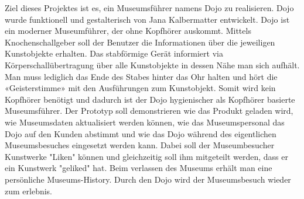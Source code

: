 Ziel dieses Projektes ist es, ein Museumsführer namens Dojo zu realisieren. Dojo wurde funktionell und gestalterisch von Jana Kalbermatter entwickelt. Dojo ist ein moderner Museumführer, der ohne Kopfhörer auskommt. Mittels Knochenschallgeber soll der Benutzer die Informationen über die jeweiligen Kunstobjekte erhalten. Das stabförmige Gerät informiert via Körperschallübertragung über alle Kunstobjekte in dessen Nähe man sich aufhält. Man muss lediglich das Ende des Stabes hinter das Ohr halten und hört die «Geisterstimme» mit den Ausführungen zum Kunstobjekt. Somit wird kein Kopfhörer benötigt und dadurch ist der Dojo hygienischer als Kopfhörer basierte Museumsführer.
Der Prototyp soll demonstrieren wie das Produkt geladen wird, wie Museumsdaten aktualisiert werden können, wie das Museumspersonal das Dojo auf den Kunden abstimmt und wie das Dojo während des eigentlichen Museumsbesuches eingesetzt werden kann. Dabei soll der Museumbesucher Kunstwerke "Liken" können und gleichzeitig soll ihm mitgeteilt werden, dass er ein Kunstwerk "geliked" hat.
Beim verlassen des Museums erhält man eine persönliche Museums-History. Durch den Dojo wird der Museumsbesuch wieder zum erlebnis.
